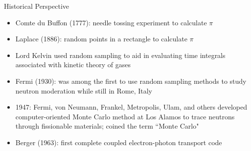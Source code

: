 \documentclass[xcolor=x11names,compress]{beamer}
\renewcommand{\(}{\begin{columns}}
\renewcommand{\)}{\end{columns}}
\newcommand{\<}[1]{\begin{column}{#1}}
\renewcommand{\>}{\end{column}}
\begin{document}
\begin{frame}{Historical Perspective}

  \begin{itemize}
  \item Comte du Buffon (1777): needle tossing experiment to calculate $\pi$
  \item Laplace (1886): random points in a rectangle to calculate $\pi$
  \item Lord Kelvin used random sampling to aid in evaluating time integrals associated with kinetic theory of gases
  \item Fermi (1930): was among the first to use random sampling methods to study neutron moderation while still in Rome, Italy
  \item 1947: Fermi, von Neumann, Frankel, Metropolis, Ulam, and others developed computer-oriented Monte Carlo method at Los Alamos to trace neutrons through fissionable materials; coined the term ``Monte Carlo"
  \item Berger (1963): first complete coupled electron-photon transport code 
\end{itemize}
\end{frame}
\end{document}
